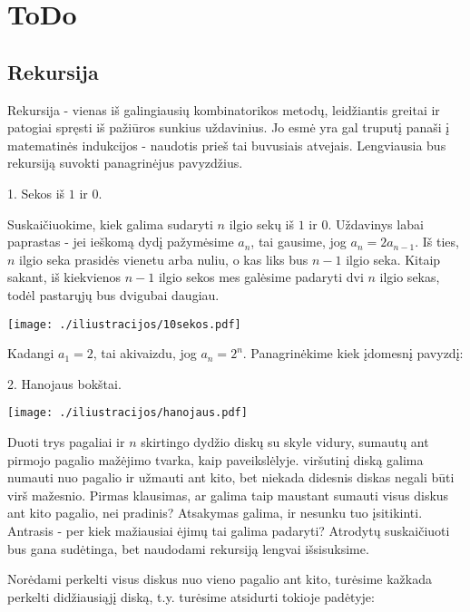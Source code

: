 \chapter{ToDo}
\section{Rekursija}

\noindent Rekursija - vienas iš galingiausių kombinatorikos metodų, leidžiantis greitai ir patogiai spręsti iš pažiūros sunkius uždavinius. Jo esmė yra gal truputį panaši į matematinės indukcijos - naudotis prieš tai buvusiais atvejais. Lengviausia bus rekursiją suvokti panagrinėjus pavyzdžius. 
\bigskip

1. Sekos iš $1$ ir $0$.

Suskaičiuokime, kiek galima sudaryti $n$ ilgio sekų iš $1$ ir $0$. Uždavinys labai paprastas - jei ieškomą dydį pažymėsime $a_n$, tai gausime, jog $a_n = 2a_{n-1}$. Iš ties, $n$ ilgio seka prasidės vienetu arba nuliu, o kas liks bus $n-1$ ilgio seka. Kitaip sakant, iš kiekvienos $n-1$ ilgio sekos mes galėsime padaryti dvi $n$ ilgio sekas, todėl pastarųjų bus dvigubai daugiau. 
\begin{center}
  \texttt{[image: ./iliustracijos/10sekos.pdf]}
\end{center}

Kadangi $a_1 = 2$, tai akivaizdu, jog $a_n = 2^n.$ Panagrinėkime kiek įdomesnį pavyzdį:

\bigskip

2. Hanojaus bokštai.

\bigskip

\begin{center}
  \texttt{[image: ./iliustracijos/hanojaus.pdf]}
\end{center}

Duoti trys pagaliai ir $n$ skirtingo dydžio diskų su skyle vidury, sumautų ant pirmojo pagalio mažėjimo tvarka, kaip paveikslėlyje. viršutinį diską galima numauti nuo pagalio ir užmauti ant kito, bet niekada didesnis diskas negali būti virš mažesnio. Pirmas klausimas, ar galima taip maustant sumauti visus diskus ant kito pagalio, nei pradinis? Atsakymas galima, ir nesunku tuo įsitikinti. Antrasis - per kiek mažiausiai ėjimų tai galima padaryti? Atrodytų suskaičiuoti bus gana sudėtinga, bet naudodami rekursiją lengvai išsisuksime. 

Norėdami perkelti visus diskus nuo vieno pagalio ant kito, turėsime kažkada perkelti didžiausiąjį diską, t.y. turėsime atsidurti tokioje padėtyje:

